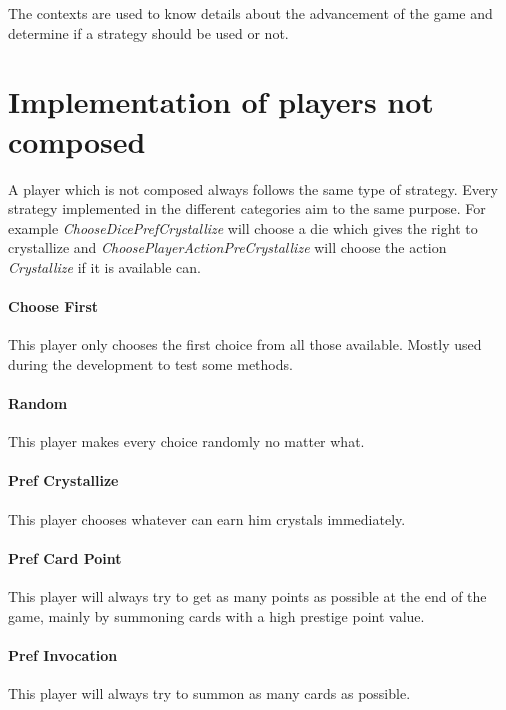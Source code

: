         The contexts are used to know details about the advancement of the game and determine if a strategy should be used or not.
            
    \newpage
    \section{Implementation of players not composed}
    
        A player which is not composed always follows the same type of strategy.
        Every strategy implemented in the different categories aim to the same purpose.
        For example \textit{ChooseDicePrefCrystallize} will choose a die which gives the right to crystallize and \textit{ChoosePlayerActionPreCrystallize} will choose the action \textit{Crystallize} if it is available can.
        
            \paragraph{Choose First}
            This player only chooses the first choice from all those available. Mostly used during the development to test some methods.
            
            \paragraph{Random}
            This player makes every choice randomly no matter what.
            
            \paragraph{Pref Crystallize}
            This player chooses whatever can earn him crystals immediately.
            
            \paragraph{Pref Card Point}
            This player will always try to get as many points as possible at the end of the game, mainly by summoning cards with a high prestige point value.
            
            \paragraph{Pref Invocation}
            This player will always try to summon as many cards as possible.
            
